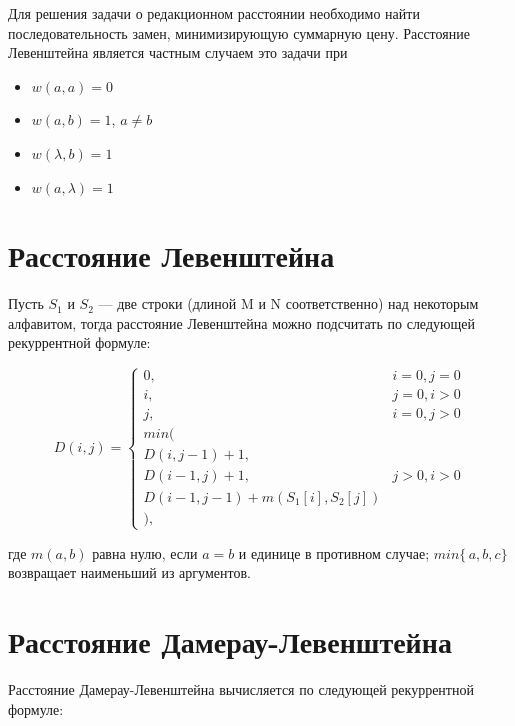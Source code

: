 \documentclass[12pt]{report}
\begin{document}
Для решения задачи о редакционном расстоянии необходимо найти последовательность замен, минимизирующую суммарную цену. Расстояние Левенштейна является частным случаем это задачи при

\begin{itemize}
	\item $w(a, a) = 0$
	\item $w(a, b) = 1$, $a \neq b$
	\item $w(\lambda, b) = 1$
	\item $w(a, \lambda) = 1$ 
\end{itemize}

\section{Расстояние Левенштейна}

Пусть $S_{1}$ и $S_{2}$ — две строки (длиной M и N соответственно) над некоторым алфавитом, тогда расстояние Левенштейна можно подсчитать по следующей рекуррентной формуле:

\begin{displaymath}
	D(i,j) = \left\{ \begin{array}{ll}
	0, & \textrm{$i = 0, j = 0$}\\
	i, & \textrm{$j = 0, i > 0$}\\
	j, & \textrm{$i = 0, j > 0$}\\
	min(\\
	D(i,j-1)+1,\\
	D(i-1, j) +1, &\textrm{$j>0, i>0$}\\
	D(i-1, j-1) + m(S_{1}[i], S_{2}[j])\\
	),
	\end{array} \right.
\end{displaymath}

\noindent
где $m(a,b)$ равна нулю, если $a=b$ и единице в противном случае; $min\{\,a,b,c\}$ возвращает наименьший из аргументов.

\section{Расстояние Дамерау-Левенштейна}

Расстояние Дамерау-Левенштейна вычисляется по следующей рекуррентной формуле:
		    
\end{document}
